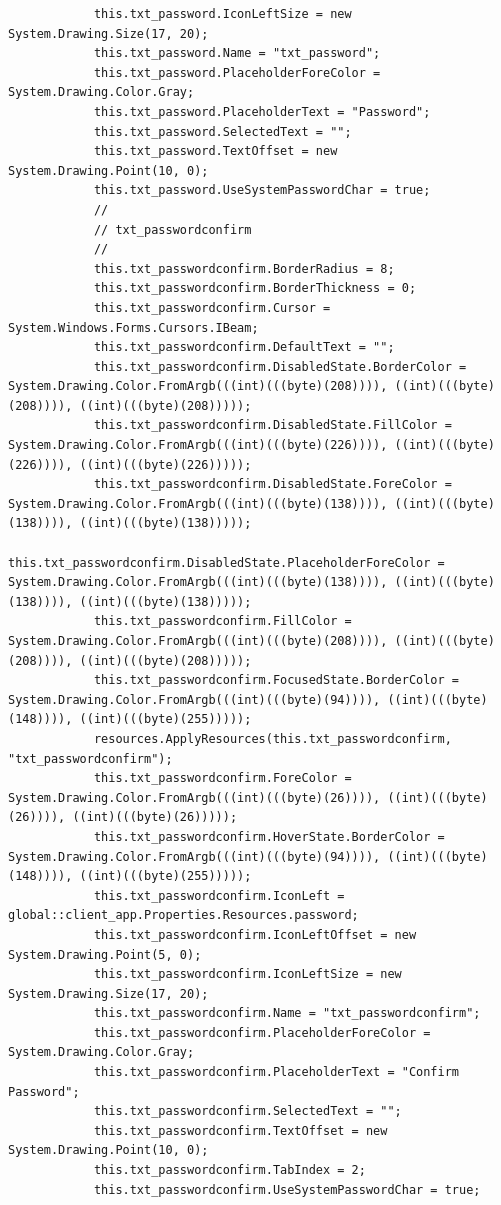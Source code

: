\documentclass{article}
\begin{document}
\begin{verbatim}
			this.txt_password.IconLeftSize = new System.Drawing.Size(17, 20);
			this.txt_password.Name = "txt_password";
			this.txt_password.PlaceholderForeColor = System.Drawing.Color.Gray;
			this.txt_password.PlaceholderText = "Password";
			this.txt_password.SelectedText = "";
			this.txt_password.TextOffset = new System.Drawing.Point(10, 0);
			this.txt_password.UseSystemPasswordChar = true;
			// 
			// txt_passwordconfirm
			// 
			this.txt_passwordconfirm.BorderRadius = 8;
			this.txt_passwordconfirm.BorderThickness = 0;
			this.txt_passwordconfirm.Cursor = System.Windows.Forms.Cursors.IBeam;
			this.txt_passwordconfirm.DefaultText = "";
			this.txt_passwordconfirm.DisabledState.BorderColor = System.Drawing.Color.FromArgb(((int)(((byte)(208)))), ((int)(((byte)(208)))), ((int)(((byte)(208)))));
			this.txt_passwordconfirm.DisabledState.FillColor = System.Drawing.Color.FromArgb(((int)(((byte)(226)))), ((int)(((byte)(226)))), ((int)(((byte)(226)))));
			this.txt_passwordconfirm.DisabledState.ForeColor = System.Drawing.Color.FromArgb(((int)(((byte)(138)))), ((int)(((byte)(138)))), ((int)(((byte)(138)))));
			this.txt_passwordconfirm.DisabledState.PlaceholderForeColor = System.Drawing.Color.FromArgb(((int)(((byte)(138)))), ((int)(((byte)(138)))), ((int)(((byte)(138)))));
			this.txt_passwordconfirm.FillColor = System.Drawing.Color.FromArgb(((int)(((byte)(208)))), ((int)(((byte)(208)))), ((int)(((byte)(208)))));
			this.txt_passwordconfirm.FocusedState.BorderColor = System.Drawing.Color.FromArgb(((int)(((byte)(94)))), ((int)(((byte)(148)))), ((int)(((byte)(255)))));
			resources.ApplyResources(this.txt_passwordconfirm, "txt_passwordconfirm");
			this.txt_passwordconfirm.ForeColor = System.Drawing.Color.FromArgb(((int)(((byte)(26)))), ((int)(((byte)(26)))), ((int)(((byte)(26)))));
			this.txt_passwordconfirm.HoverState.BorderColor = System.Drawing.Color.FromArgb(((int)(((byte)(94)))), ((int)(((byte)(148)))), ((int)(((byte)(255)))));
			this.txt_passwordconfirm.IconLeft = global::client_app.Properties.Resources.password;
			this.txt_passwordconfirm.IconLeftOffset = new System.Drawing.Point(5, 0);
			this.txt_passwordconfirm.IconLeftSize = new System.Drawing.Size(17, 20);
			this.txt_passwordconfirm.Name = "txt_passwordconfirm";
			this.txt_passwordconfirm.PlaceholderForeColor = System.Drawing.Color.Gray;
			this.txt_passwordconfirm.PlaceholderText = "Confirm Password";
			this.txt_passwordconfirm.SelectedText = "";
			this.txt_passwordconfirm.TextOffset = new System.Drawing.Point(10, 0);
			this.txt_passwordconfirm.TabIndex = 2;
			this.txt_passwordconfirm.UseSystemPasswordChar = true;

\end{verbatim}
\end{document}
